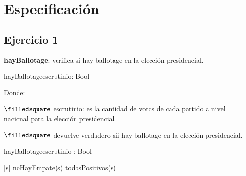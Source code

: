 \documentclass[10pt,a4paper]{article}
\begin{document}
\maketitle


\section{Especificación}

\subsection{Ejercicio 1} 

\textbf{hayBallotage}: verifica si hay ballotage en la elección presidencial.

\begin{proc}{hayBallotage}{\In escrutinio: \TLista{\ent}}{Bool}
\end{proc}

Donde:

\quad $\filledsquare$ escrutinio: es la cantidad de votos de cada partido a nivel nacional para la elección presidencial.

\quad $\filledsquare$ devuelve verdadero sii hay ballotage en la elección presidencial.

\vspace{0.3cm}
\vspace{0.3cm}

\begin{proc}{hayBallotage}{\In escrutinio : \TLista{\ent}}{Bool} 
\end{proc}

\vspace{0.3cm}
{|s|  \wedge noHayEmpate(s) \wedge  todosPositivos(s)}

\vspace{0.3cm}

\vspace{0.3cm}

\vspace{0.3cm}
\end{document}
